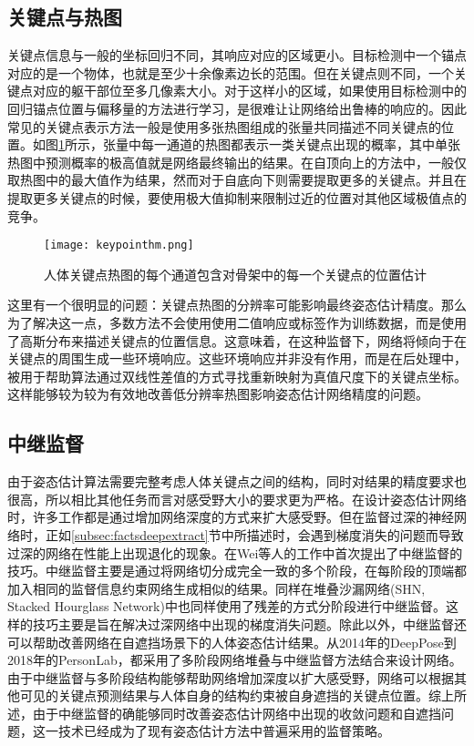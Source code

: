 \subsection{关键点与热图}
\label{subsec:factsheatmaps}
关键点信息与一般的坐标回归不同，其响应对应的区域更小。目标检测中一个锚点对应的是一个物体，也就是至少十余像素边长的范围。但在关键点则不同，一个关键点对应的躯干部位至多几像素大小。对于这样小的区域，如果使用目标检测中的回归锚点位置与偏移量的方法进行学习，是很难让让网络给出鲁棒的响应的。因此常见的关键点表示方法一般是使用多张热图组成的张量共同描述不同关键点的位置。如图\ref{fig:keypointhm}所示，张量中每一通道的热图都表示一类关键点出现的概率，其中单张热图中预测概率的极高值就是网络最终输出的结果。在自顶向上的方法中，一般仅取热图中的最大值作为结果，然而对于自底向下则需要提取更多的关键点。并且在提取更多关键点的时候，要使用极大值抑制来限制过近的位置对其他区域极值点的竞争。

\begin{figure}[h]	
	\centering
	\texttt{[image: keypointhm.png]}
	\caption{人体关键点热图的每个通道包含对骨架中的每一个关键点的位置估计\cite{newell2016stacked}}
	\label{fig:keypointhm}
\end{figure}

这里有一个很明显的问题：关键点热图的分辨率可能影响最终姿态估计精度。那么为了解决这一点，多数方法不会使用使用二值响应或标签作为训练数据，而是使用了高斯分布来描述关键点的位置信息。这意味着，在这种监督下，网络将倾向于在关键点的周围生成一些环境响应。这些环境响应并非没有作用，而是在后处理中，被用于帮助算法通过双线性差值的方式寻找重新映射为真值尺度下的关键点坐标。这样能够较为较为有效地改善低分辨率热图影响姿态估计网络精度的问题。

\subsection{中继监督}
\label{subsec:factsintersupervision}
由于姿态估计算法需要完整考虑人体关键点之间的结构，同时对结果的精度要求也很高，所以相比其他任务而言对感受野大小的要求更为严格。在设计姿态估计网络时，许多工作都是通过增加网络深度的方式来扩大感受野。但在监督过深的神经网络时，正如\ref{subsec:factsdeepextract}节中所描述时，会遇到梯度消失的问题而导致过深的网络在性能上出现退化的现象。在Wei等人的工作中\cite{wei2016convolutional}首次提出了中继监督的技巧。中继监督主要是通过将网络切分成完全一致的多个阶段，在每阶段的顶端都加入相同的监督信息约束网络生成相似的结果。同样在堆叠沙漏网络(SHN, Stacked Hourglass Network)\cite{newell2016stacked}中也同样使用了残差的方式分阶段进行中继监督。这样的技巧主要是旨在解决过深网络中出现的梯度消失问题。除此以外，中继监督还可以帮助改善网络在自遮挡场景下的人体姿态估计结果。从2014年的DeepPose\cite{toshev2014deeppose}到2018年的PersonLab\cite{Papandreou2018PersonLab}，都采用了多阶段网络堆叠与中继监督方法结合来设计网络。由于中继监督与多阶段结构能够帮助网络增加深度以扩大感受野，网络可以根据其他可见的关键点预测结果与人体自身的结构约束被自身遮挡的关键点位置。综上所述，由于中继监督的确能够同时改善姿态估计网络中出现的收敛问题和自遮挡问题，这一技术已经成为了现有姿态估计方法中普遍采用的监督策略。

